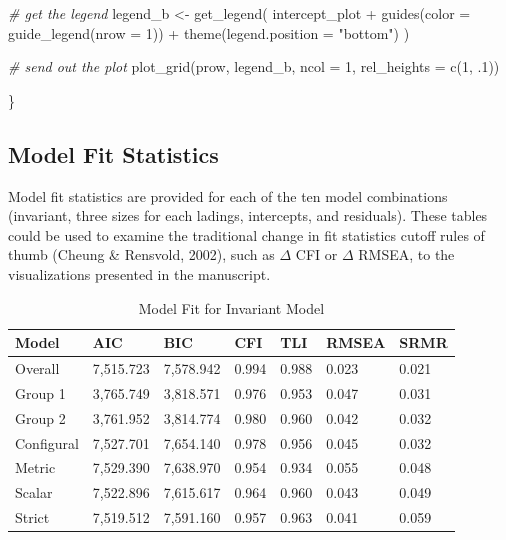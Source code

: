\documentclass[
  man]{apa7}
\newenvironment{Shaded}{\begin{snugshade}}{\end{snugshade}}
\newcommand{\AttributeTok}[1]{\textcolor[rgb]{0.77,0.63,0.00}{#1}}
\newcommand{\CommentTok}[1]{\textcolor[rgb]{0.56,0.35,0.01}{\textit{#1}}}
\newcommand{\DecValTok}[1]{\textcolor[rgb]{0.00,0.00,0.81}{#1}}
\newcommand{\FunctionTok}[1]{\textcolor[rgb]{0.00,0.00,0.00}{#1}}
\newcommand{\NormalTok}[1]{#1}
\newcommand{\OtherTok}[1]{\textcolor[rgb]{0.56,0.35,0.01}{#1}}
\newcommand{\SpecialCharTok}[1]{\textcolor[rgb]{0.00,0.00,0.00}{#1}}
\newcommand{\StringTok}[1]{\textcolor[rgb]{0.31,0.60,0.02}{#1}}
\begin{document}
\begin{Shaded}
\begin{Highlighting}[]
  \CommentTok{\# get the legend}
\NormalTok{  legend\_b }\OtherTok{\textless{}{-}} \FunctionTok{get\_legend}\NormalTok{(}
\NormalTok{    intercept\_plot }\SpecialCharTok{+} 
      \FunctionTok{guides}\NormalTok{(}\AttributeTok{color =} \FunctionTok{guide\_legend}\NormalTok{(}\AttributeTok{nrow =} \DecValTok{1}\NormalTok{)) }\SpecialCharTok{+}
      \FunctionTok{theme}\NormalTok{(}\AttributeTok{legend.position =} \StringTok{"bottom"}\NormalTok{)}
\NormalTok{  )}
  
  \CommentTok{\# send out the plot }
  \FunctionTok{plot\_grid}\NormalTok{(prow, legend\_b, }\AttributeTok{ncol =} \DecValTok{1}\NormalTok{, }\AttributeTok{rel\_heights =} \FunctionTok{c}\NormalTok{(}\DecValTok{1}\NormalTok{, .}\DecValTok{1}\NormalTok{))}
  
\NormalTok{\}}
\end{Highlighting}
\end{Shaded}

\normalsize

\hypertarget{model-fit-statistics}{%
\subsection{Model Fit Statistics}\label{model-fit-statistics}}

Model fit statistics are provided for each of the ten model combinations (invariant, three sizes for each ladings, intercepts, and residuals). These tables could be used to examine the traditional change in fit statistics cutoff rules of thumb (Cheung \& Rensvold, 2002), such as \(\Delta\) CFI or \(\Delta\) RMSEA, to the visualizations presented in the manuscript.

\begin{table}[tbp]

\begin{center}
\begin{threeparttable}

\caption{\label{tab:tab1}Model Fit for Invariant Model}

\begin{tabular}{lllllll}
\toprule
Model & AIC & BIC & CFI & TLI & RMSEA & SRMR\\
\midrule
Overall & 7,515.723 & 7,578.942 & 0.994 & 0.988 & 0.023 & 0.021\\
Group 1 & 3,765.749 & 3,818.571 & 0.976 & 0.953 & 0.047 & 0.031\\
Group 2 & 3,761.952 & 3,814.774 & 0.980 & 0.960 & 0.042 & 0.032\\
Configural & 7,527.701 & 7,654.140 & 0.978 & 0.956 & 0.045 & 0.032\\
Metric & 7,529.390 & 7,638.970 & 0.954 & 0.934 & 0.055 & 0.048\\
Scalar & 7,522.896 & 7,615.617 & 0.964 & 0.960 & 0.043 & 0.049\\
Strict & 7,519.512 & 7,591.160 & 0.957 & 0.963 & 0.041 & 0.059\\
\bottomrule
\end{tabular}

\end{threeparttable}
\end{center}

\end{table}
\end{document}
